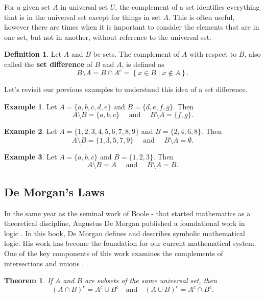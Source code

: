 \documentclass[
]{book}
\newtheorem{theorem}{Theorem}[chapter]
\theoremstyle{definition}
\newtheorem{definition}{Definition}[chapter]
\theoremstyle{definition}
\newtheorem{example}{Example}[chapter]
\theoremstyle{definition}
\theoremstyle{definition}
\theoremstyle{remark}
\begin{document}
For a given set \(A\) in universal set \(U\), the complement of a set identifies everything that is in the universal set except for things in set \(A\). This is often useful, however there are times when it is important to consider the elements that are in one set, but not in another, without reference to the universal set.

\begin{definition}
\protect\hypertarget{def:set-difference}{}\label{def:set-difference}Let \(A\) and \(B\) be sets. The complement of \(A\) with respect to \(B\), also called the \textbf{set difference} of \(B\) and \(A\), is defined as \[B\setminus A = B \cap A^c = \left\{x\in B \middle \vert x \notin A\right\}.\]
\end{definition}

Let's revisit our previous examples to understand this idea of a set difference.

\begin{example}
Let \(A = \{a, b, c, d, e\}\) and \(B = \{ d, e, f, g\}\). Then \[A\setminus B=\{a, b, c\} \quad \mbox{ and } \quad  B\setminus A =\{ f, g\}.\]
\end{example}

\begin{example}
Let \(A=\{1,2,3,4,5,6,7,8,9\}\) and \(B=\{2,4,6,8\}\). Then
\[A \setminus B = \{1,3,5,7,9\} \quad \mbox{ and } \quad B\setminus A = \emptyset.\]
\end{example}

\begin{example}
Let \(A=\{a,b,c\}\) and \(B=\{1,2,3\}\). Then
\[A\setminus B = A \quad \mbox{ and } \quad B\setminus A =B.\]
\end{example}

\hypertarget{de-morgans-laws}{%
\subsection{De Morgan's Laws}\label{de-morgans-laws}}

In the same year as the seminal work of Boole -\citet{Boole} that started mathematics as a theoretical discipline, Augustus De Morgan published a foundational work in logic \citep{DeMorgan}. In this book, De Morgan defines and describes symbolic mathematical logic. His work has become the foundation for our current mathematical system. One of the key components of this work examines the complements of intersections and unions \citep[p.~69]{DeMorgan}.

\begin{theorem}
\protect\hypertarget{thm:DeMorgan-laws}{}\label{thm:DeMorgan-laws}If \(A\) and \(B\) are subsets of the same universal set, then
\[ \left(A \cap B\right)^c = A^c \cup B^c \quad \mbox{and} \quad \left(A \cup B \right)^c = A^c \cap B^c.\]
\end{theorem}
\end{document}
